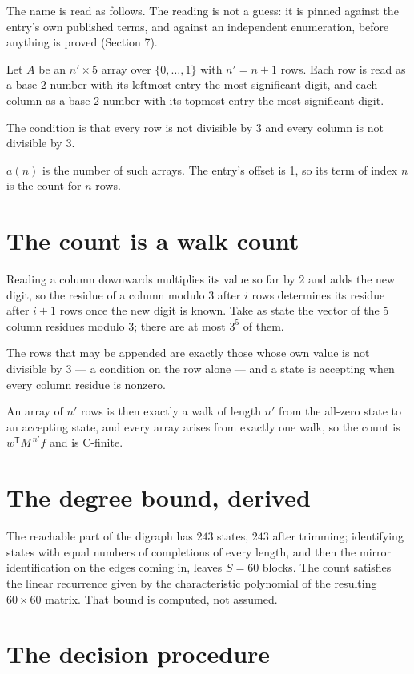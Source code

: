 \documentclass[11pt]{article}
\theoremstyle{definition}
\begin{document}
The name is read as follows. The reading is not a guess: it is pinned against the entry's own published terms, and against an independent enumeration, before anything is proved (Section 7).

Let $A$ be an $n' \times 5$ array over $\{0,\dots,1\}$ with $n' = n + 1$ rows. Each row is read as a base-$2$ number with its leftmost entry the most significant digit, and each column as a base-$2$ number with its topmost entry the most significant digit.

The condition is that every row is not divisible by $3$ and every column is not divisible by $3$.

$a(n)$ is the number of such arrays. The entry's offset is 1, so its term of index $n$ is the count for $n$ rows.

\section{The count is a walk count}

Reading a column downwards multiplies its value so far by $2$ and adds the new digit, so the residue of a column modulo $3$ after $i$ rows determines its residue after $i+1$ rows once the new digit is known. Take as state the vector of the $5$ column residues modulo $3$; there are at most $3^{5}$ of them.

The rows that may be appended are exactly those whose own value is not divisible by $3$ --- a condition on the row alone --- and a state is accepting when every column residue is nonzero.

An array of $n'$ rows is then exactly a walk of length $n'$ from the all-zero state to an accepting state, and every array arises from exactly one walk, so the count is $w^{\mathsf T}M^{\,n'}f$ and is C-finite.

\section{The degree bound, derived}

The reachable part of the digraph has $243$ states, $243$ after trimming; identifying states with equal numbers of completions of every length, and then the mirror identification on the edges coming in, leaves $S = 60$ blocks. The count satisfies the linear recurrence given by the characteristic polynomial of the resulting $60\times60$ matrix. That bound is computed, not assumed.

\section{The decision procedure}
\end{document}
